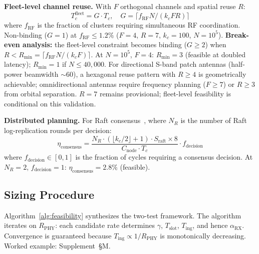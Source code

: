 \documentclass[journal]{IEEEtran}
\begin{document}
\textbf{Fleet-level channel reuse.} With $F$ orthogonal channels and spatial reuse $R$:
\begin{equation}
    T_c^{\text{fleet}} = G \cdot T_c, \quad G = \lceil f_{\text{RF}} N / (k_c F R) \rceil
    \label{eq:fleet_reuse}
\end{equation}
where $f_{\text{RF}}$ is the fraction of clusters requiring simultaneous RF coordination. Non-binding ($G = 1$) at $f_{\text{RF}} \leq 1.2\%$ ($F = 4$, $R = 7$, $k_c = 100$, $N = 10^5$). \textbf{Break-even analysis:} the fleet-level constraint becomes binding ($G \geq 2$) when $R < R_{\min} = \lceil f_{\text{RF}} N / (k_c F) \rceil$. At $N = 10^5$, $F = 4$: $R_{\min} = 3$ (feasible at doubled latency); $R_{\min} = 1$ if $N \leq 40{,}000$. For directional S-band patch antennas (half-power beamwidth ${\sim}60$\textdegree), a hexagonal reuse pattern with $R \geq 4$ is geometrically achievable; omnidirectional antennas require frequency planning ($F \geq 7$) or $R \geq 3$ from orbital separation. $R = 7$ remains provisional; fleet-level feasibility is conditional on this validation.

\textbf{Distributed planning.} For Raft consensus~\cite{ongaro_raft}, where $N_R$ is the number of Raft log-replication rounds per decision:
\begin{equation}
    \eta_{\text{consensus}} = \frac{N_R \cdot (\lfloor k_c/2 \rfloor + 1) \cdot S_{\text{raft}} \times 8}{C_{\text{node}} \cdot T_c} \cdot f_{\text{decision}}
    \label{eq:eta_consensus}
\end{equation}
where $f_{\text{decision}} \in [0,1]$ is the fraction of cycles requiring a consensus decision. At $N_R = 2$, $f_{\text{decision}} = 1$: $\eta_{\text{consensus}} = 2.8\%$ (feasible).

\subsection{Sizing Procedure}

Algorithm~\ref{alg:feasibility} synthesizes the two-test framework. The algorithm iterates on $R_{\text{PHY}}$: each candidate rate determines $\gamma$, $T_{\text{slot}}$, $T_{\text{ing}}$, and hence $\alpha_{\text{RX}}$. Convergence is guaranteed because $T_{\text{ing}} \propto 1/R_{\text{PHY}}$ is monotonically decreasing. Worked example: Supplement~\S M.
\end{document}
